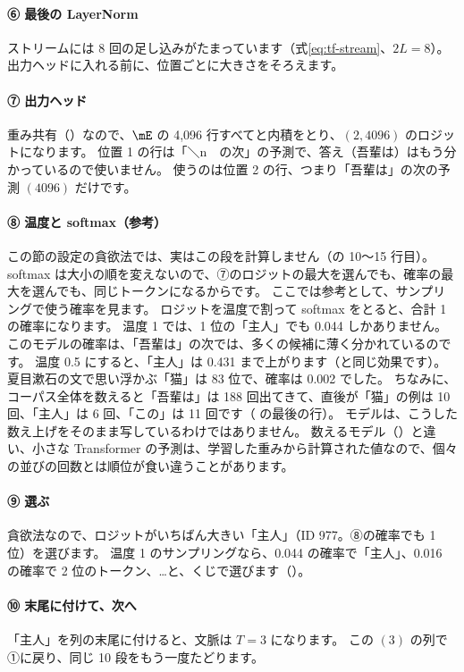 \paragraph{⑥ 最後の LayerNorm}
ストリームには 8 回の足し込みがたまっています（式\eqref{eq:tf-stream}、$2L=8$）。
出力ヘッドに入れる前に、位置ごとに大きさをそろえます。

\paragraph{⑦ 出力ヘッド}
重み共有（）なので、$\mE$ の 4,096 行すべてと内積をとり、$(2,4096)$ のロジットになります。
位置 1 の行は「＼n　の次」の予測で、答え（吾輩は）はもう分かっているので使いません。
使うのは位置 2 の行、つまり「吾輩は」の次の予測 $(4096)$ だけです。

\paragraph{⑧ 温度と softmax（参考）}
この節の設定の貪欲法では、実はこの段を計算しません（の 10〜15 行目）。
softmax は大小の順を変えないので、⑦のロジットの最大を選んでも、確率の最大を選んでも、同じトークンになるからです。
ここでは参考として、サンプリングで使う確率を見ます。
ロジットを温度で割って softmax をとると、合計 1 の確率になります。
温度 1 では、1 位の「主人」でも 0.044 しかありません。
このモデルの確率は、「吾輩は」の次では、多くの候補に薄く分かれているのです。
温度 0.5 にすると、「主人」は 0.431 まで上がります（と同じ効果です）。
夏目漱石の文で思い浮かぶ「猫」は 83 位で、確率は 0.002 でした。
ちなみに、コーパス全体を数えると「吾輩は」は 188 回出てきて、直後が「猫」の例は 10 回、「主人」は 6 回、「この」は 11 回です（ の最後の行）。
モデルは、こうした数え上げをそのまま写しているわけではありません。
数えるモデル（）と違い、小さな Transformer の予測は、学習した重みから計算された値なので、個々の並びの回数とは順位が食い違うことがあります。

\paragraph{⑨ 選ぶ}
貪欲法なので、ロジットがいちばん大きい「主人」（ID 977。⑧の確率でも 1 位）を選びます。
温度 1 のサンプリングなら、0.044 の確率で「主人」、0.016 の確率で 2 位のトークン、…と、くじで選びます（）。

\paragraph{⑩ 末尾に付けて、次へ}
「主人」を列の末尾に付けると、文脈は $T=3$ になります。
この $(3)$ の列で①に戻り、同じ 10 段をもう一度たどります。

